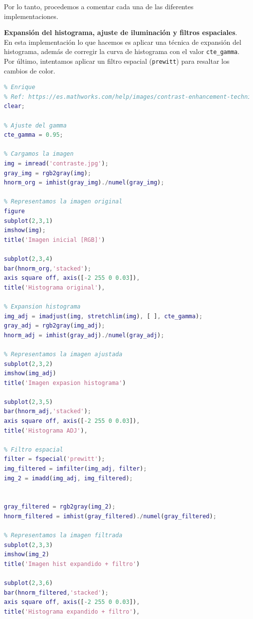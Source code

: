 \documentclass[12pt]{article}
\begin{document}
	\noindent Por lo tanto, procedemos a comentar cada una de las diferentes implementaciones.
	
	\pagebreak
	
	\noindent \textbf{\large Expansión del histograma, ajuste de iluminación y filtros espaciales}. \\ 
	
	\noindent En esta implementación lo que hacemos es aplicar una técnica de expansión del histograma, además de corregir la curva de histograma con el valor \texttt{cte\_gamma}. Por último, intentamos aplicar un filtro espacial (\texttt{prewitt}) para resaltar los cambios de color.
	
	\vspace{10px}
	
	\begin{lstlisting}[language=Matlab, caption={Implementación contraste con expansión de histograma en \texttt{MATLAB}}]
% 2 - Contraste 
% Enrique
% Ref: https://es.mathworks.com/help/images/contrast-enhancement-techniques.html
clear;

% Ajuste del gamma
cte_gamma = 0.95;

% Cargamos la imagen
img = imread('contraste.jpg');
gray_img = rgb2gray(img);
hnorm_org = imhist(gray_img)./numel(gray_img);

% Representamos la imagen original
figure
subplot(2,3,1)
imshow(img);
title('Imagen inicial [RGB]')

subplot(2,3,4)
bar(hnorm_org,'stacked'); 
axis square off, axis([-2 255 0 0.03]), 
title('Histograma original'), 

% Expansion histograma
img_adj = imadjust(img, stretchlim(img), [ ], cte_gamma);
gray_adj = rgb2gray(img_adj);
hnorm_adj = imhist(gray_adj)./numel(gray_adj);

% Representamos la imagen ajustada
subplot(2,3,2)
imshow(img_adj)
title('Imagen expasion histograma')

subplot(2,3,5)
bar(hnorm_adj,'stacked'); 
axis square off, axis([-2 255 0 0.03]), 
title('Histograma ADJ'), 

% Filtro espacial
filter = fspecial('prewitt');
img_filtered = imfilter(img_adj, filter);
img_2 = imadd(img_adj, img_filtered);


gray_filtered = rgb2gray(img_2);
hnorm_filtered = imhist(gray_filtered)./numel(gray_filtered);

% Representamos la imagen filtrada
subplot(2,3,3)
imshow(img_2)
title('Imagen hist expandido + filtro')

subplot(2,3,6)
bar(hnorm_filtered,'stacked'); 
axis square off, axis([-2 255 0 0.03]), 
title('Histograma expandido + filtro'), 
	\end{lstlisting}
\end{document}
